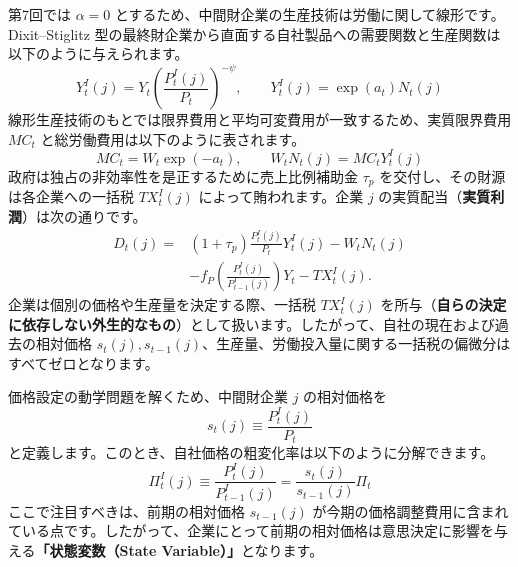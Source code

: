 \documentclass[
  japanese,
  lualatex,
  ja=standard,
  12pt,
  a4paper]{ltjsarticle}
\begin{document}
第7回では \(\alpha=0\)
とするため、中間財企業の生産技術は労働に関して線形です。Dixit--Stiglitz
型の最終財企業から直面する自社製品への需要関数と生産関数は以下のように与えられます。
\[
Y_t^I(j)=Y_t\left(\frac{P_t^I(j)}{P_t}\right)^{-\psi},
\qquad
Y_t^I(j)=\exp(a_t)N_t(j)
\]
線形生産技術のもとでは限界費用と平均可変費用が一致するため、実質限界費用
\(MC_t\) と総労働費用は以下のように表されます。 \[
MC_t= W_t\exp(-a_t),
\qquad
W_tN_t(j)=MC_tY_t^I(j)
\] 政府は独占の非効率性を是正するために売上比例補助金 \(\tau_p\)
を交付し、その財源は各企業への一括税 \(TX_t^I(j)\)
によって賄われます。企業 \(j\)
の実質配当（\textbf{実質利潤}）は次の通りです。 \[
\begin{aligned}
D_t(j)={}&
(1+\tau_p)\frac{P_t^I(j)}{P_t}Y_t^I(j)
-W_tN_t(j)\\
&-f_P\left(\frac{P_t^I(j)}{P_{t-1}^I(j)}\right)Y_t
-TX_t^I(j).
\end{aligned}
\] 企業は個別の価格や生産量を決定する際、一括税 \(TX_t^I(j)\)
を所与（\textbf{自らの決定に依存しない外生的なもの}）として扱います。したがって、自社の現在および過去の相対価格
\(s_t(j), s_{t-1}(j)\)、生産量、労働投入量に関する一括税の偏微分はすべてゼロとなります。

価格設定の動学問題を解くため、中間財企業 \(j\) の相対価格を \[
s_t(j)\equiv \frac{P_t^I(j)}{P_t}
\]
と定義します。このとき、自社価格の粗変化率は以下のように分解できます。
\[
\Pi_t^I(j)
\equiv
\frac{P_t^I(j)}{P_{t-1}^I(j)}
=
\frac{s_t(j)}{s_{t-1}(j)}\Pi_t
\] ここで注目すべきは、前期の相対価格 \(s_{t-1}(j)\)
が今期の価格調整費用に含まれている点です。したがって、企業にとって前期の相対価格は意思決定に影響を与える\textbf{「状態変数（State
Variable）」}となります。
\end{document}
